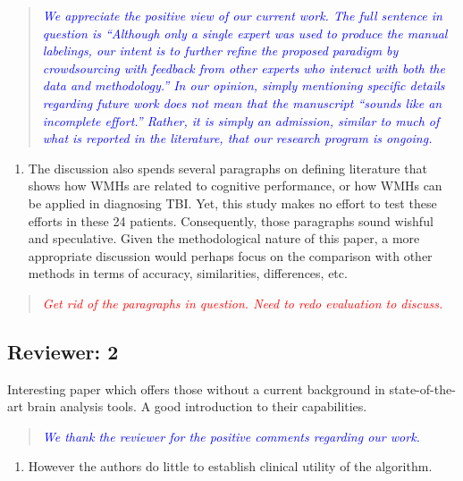 \documentclass[12pt,]{article}
\providecommand{\tightlist}{%
  \setlength{\itemsep}{0pt}\setlength{\parskip}{0pt}}
\begin{document}
\begin{quote}
\emph{\textcolor{blue}{We appreciate the positive view of our current work.
The full sentence in question is ``Although only a
single expert was used to produce the manual labelings, our intent is to
further refine the proposed paradigm by crowdsourcing with feedback from
other experts who interact with both the data and methodology.''
In our opinion, simply mentioning specific details regarding future work
does not mean that the manuscript ``sounds like an incomplete effort.''
Rather, it is simply an admission, similar to much of what is reported
in the literature, that our research program is ongoing.}}
\end{quote}

\begin{enumerate}
\def\labelenumi{\arabic{enumi}.}
\setcounter{enumi}{14}
\tightlist
\item
  The discussion also spends several paragraphs on defining literature
  that shows how WMHs are related to cognitive performance, or how WMHs
  can be applied in diagnosing TBI. Yet, this study makes no effort to
  test these efforts in these 24 patients. Consequently, those
  paragraphs sound wishful and speculative. Given the methodological
  nature of this paper, a more appropriate discussion would perhaps
  focus on the comparison with other methods in terms of accuracy,
  similarities, differences, etc.
\end{enumerate}

\begin{quote}
\emph{\textcolor{red}{Get rid of the paragraphs in question.  Need to redo evaluation
to discuss.}}
\end{quote}

\subsection{Reviewer: 2}\label{reviewer-2}

Interesting paper which offers those without a current background in
state-of-the-art brain analysis tools. A good introduction to their
capabilities.

\begin{quote}
\emph{\textcolor{blue}{We thank the reviewer for the positive comments regarding our work.}}
\end{quote}

\begin{enumerate}
\def\labelenumi{\arabic{enumi}.}
\tightlist
\item
  However the authors do little to establish clinical utility of the
  algorithm.
\end{enumerate}
\end{document}
